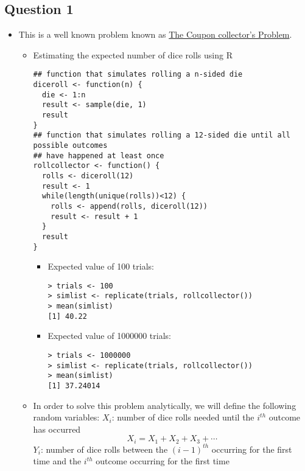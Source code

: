 \documentclass{article}
\begin{document}
\subsection*{Question 1}
    \begin{itemize}
        \item 
        This is a well known problem known as \href{https://en.wikipedia.org/wiki/Coupon_collector's_problem}{The Coupon collector's Problem}.
            \begin{itemize}
            \item
            Estimating the expected number of dice rolls using R
                    \begin{verbatim}
## function that simulates rolling a n-sided die
diceroll <- function(n) {
  die <- 1:n
  result <- sample(die, 1)
  result
}
## function that simulates rolling a 12-sided die until all possible outcomes 
## have happened at least once
rollcollector <- function() { 
  rolls <- diceroll(12)
  result <- 1
  while(length(unique(rolls))<12) {
    rolls <- append(rolls, diceroll(12))
    result <- result + 1
  }
  result
}
                    \end{verbatim}
                    \begin{itemize}
                        \item 
                            Expected value of 100 trials:
                            \begin{verbatim}
> trials <- 100
> simlist <- replicate(trials, rollcollector())
> mean(simlist)
[1] 40.22
                            \end{verbatim}
                        \item 
                            Expected value of 1000000 trials:
                            \begin{verbatim}
> trials <- 1000000
> simlist <- replicate(trials, rollcollector())
> mean(simlist)
[1] 37.24014
                            \end{verbatim}
                    \end{itemize}
                \item
                In order to solve this problem analytically, we will define the following random variables:
        \(X_i\): number of dice rolls needed until  the \(i^{th}\) outcome has occurred\\
        \[X_i = X_1 + X_2 + X_3 + \cdots \]
        \(Y_i\): number of dice rolls between the \((i-1)^{th}\) occurring for the first time and the \(i^{th}\) outcome occurring for the first time\\

\end{itemize}
\end{itemize}
\end{document}
